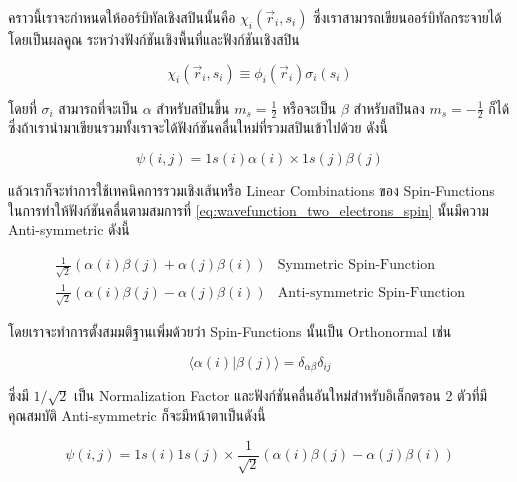 คราวนี้เราจะกำหนดให้ออร์บิทัลเชิงสปินนั้นคือ $\chi_i\left(\vec{r}_i, s_i\right)$ ซึ่งเราสามารถเขียนออร์บิทัลกระจายได้โดยเป็นผลคูณ%
ระหว่างฟังก์ชันเชิงพื้นที่และฟังก์ชันเชิงสปิน

\begin{equation}
  \chi_i\left(\vec{r}_i, s_i\right)
  \equiv
  \phi_i\left(\vec{r}_i\right) \sigma_i\left(s_i\right)
\end{equation}

\noindent โดยที่ $\sigma_i$ สามารถที่จะเป็น $\alpha$ สำหรับสปินขึ้น $m_s=\frac{1}{2}$ หรือจะเป็น $\beta$ สำหรับสปินลง
$m_s=-\frac{1}{2}$ ก็ได้ ซึ่งถ้าเรานำมาเขียนรวมทั้งเราจะได้ฟังก์ชันคลื่นใหม่ที่รวมสปินเข้าไปด้วย ดังนี้

\begin{equation}
  \label{eq:wavefunction_two_electrons_spin}
  \psi(i, j)
  =
  1 s(i) \alpha(i) \times 1 s(j) \beta(j)
\end{equation}

\noindent แล้วเราก็จะทำการใช้เทคนิคการรวมเชิงเส้นหรือ Linear Combinations ของ Spin-Functions ในการทำให้ฟังก์ชันคลื่นตามสมการที่
\eqref{eq:wavefunction_two_electrons_spin} นั้นมีความ Anti-symmetric ดังนี้

\begin{equation}
  \begin{array}{ll}
    \frac{1}{\sqrt{2}}(\alpha(i) \beta(j) + \alpha(j) \beta(i)) & \text{Symmetric Spin-Function}      \\
    \frac{1}{\sqrt{2}}(\alpha(i) \beta(j) - \alpha(j) \beta(i)) & \text{Anti-symmetric Spin-Function}
  \end{array}
\end{equation}

\noindent โดยเราจะทำการตั้งสมมติฐานเพิ่มด้วยว่า Spin-Functions นั้นเป็น Orthonormal เช่น

\begin{equation}
  \label{eq:Spin_function_orthogonality}
  \langle\alpha(i) | \beta(j)\rangle=\delta_{\alpha \beta} \delta_{i j}
\end{equation}

\noindent ซึ่งมี $1 / \sqrt{2}$ เป็น Normalization Factor และฟังก์ชันคลื่นอันใหม่สำหรับอิเล็กตรอน 2 ตัวที่มีคุณสมบัติ Anti-symmetric
ก็จะมีหน้าตาเป็นดังนี้

\begin{equation}
  \psi(i, j)
  =
  1 s(i) 1 s(j) \times \frac{1}{\sqrt{2}}(\alpha(i) \beta(j)-\alpha(j) \beta(i))
\end{equation}

